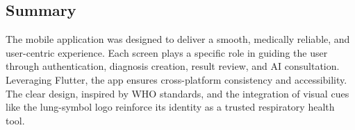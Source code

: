 \subsection{Summary}

The mobile application was designed to deliver a smooth, medically reliable, and user-centric experience. Each screen plays a specific role in guiding the user through authentication, diagnosis creation, result review, and AI consultation. Leveraging Flutter, the app ensures cross-platform consistency and accessibility. The clear design, inspired by WHO standards, and the integration of visual cues like the lung-symbol logo reinforce its identity as a trusted respiratory health tool.
